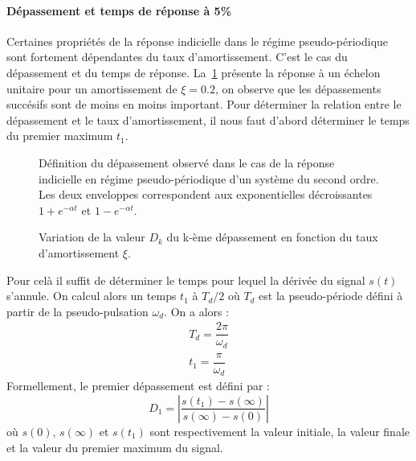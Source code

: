 \paragraph{Dépassement et temps de réponse à 5\%}
Certaines propriétés de la réponse indicielle dans le régime pseudo-périodique 
sont fortement dépendantes du taux d'amortissement. C'est le cas du 
dépassement et du temps de réponse. La~\cref{fig-2nd_depassement_1} présente 
la réponse à un échelon unitaire pour un amortissement de $\xi=0.2$, 
on observe que les dépassements succésifs sont de moins en moins important. 
Pour déterminer la relation entre le dépassement et le taux d'amortissement, 
il nous faut d'abord déterminer le temps du premier maximum $t_1$.
\begin{figure}[!h]
    \centering
    
    \caption{Définition du dépassement observé dans le cas de la réponse 
             indicielle en régime pseudo-périodique d'un système du second 
             ordre. Les deux enveloppes correspondent aux exponentielles 
             décroissantes $1+e^{-\alpha t}$ et $1-e^{-\alpha t}$. 
             \label{fig-2nd_depassement_1}}
\end{figure}
\begin{figure}[!h]
    \centering
    
    \caption{Variation de la valeur $D_k$ du k-ème dépassement en fonction 
             du taux d'amortissement $\xi$. \label{fig-2nd_depassement_2}}
\end{figure}
Pour celà il suffit de déterminer le temps pour lequel la dérivée 
du signal $s(t)$ s'annule. On calcul alors un temps $t_1$ à $T_d/2$ 
où $T_d$ est la pseudo-période défini à partir de la 
pseudo-pulsation $\omega_d$. 
On a alors :
\begin{align*}
T_d=\dfrac{2\pi}{\omega_d}\\
t_1 = \dfrac{\pi}{\omega_d}
\end{align*}
Formellement, le premier dépassement est défini par :
\[
D_1=\left|\dfrac{s(t_1)-s(\infty)}{s(\infty)-s(0)}\right|
\]
où $s(0)$, $s(\infty)$ et $s(t_1)$ sont respectivement la valeur initiale, 
la valeur finale et la valeur du premier maximum du signal.

